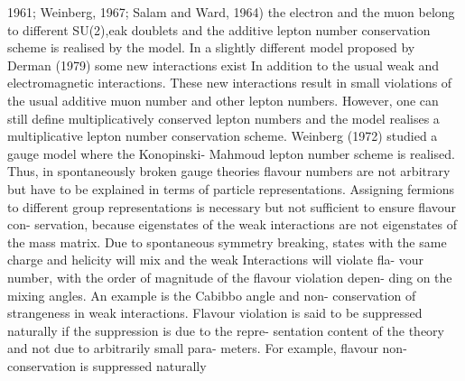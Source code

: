 \documentclass[twoside]{article}
\begin{document}
1961; Weinberg, 1967; Salam and Ward, 1964) the electron and the muon belong to
different SU(2),eak doublets and the additive lepton number conservation
scheme is realised by the model. In a slightly different model proposed
by Derman (1979) some new interactions exist In addition to the usual
weak and electromagnetic interactions. These new interactions result in
small violations of the usual additive muon number and other lepton
numbers. However, one can still define multiplicatively conserved lepton
numbers and the model realises a multiplicative lepton number conservation
scheme. Weinberg (1972) studied a gauge model where the Konopinski-
Mahmoud lepton number scheme is realised. Thus, in spontaneously broken
gauge theories flavour numbers are not arbitrary but have to be explained
in terms of particle representations. Assigning fermions to different
group representations is necessary but not sufficient to ensure flavour con-
servation, because eigenstates of the weak interactions are not eigenstates of
the mass matrix. Due to spontaneous symmetry breaking, states with the same
charge and helicity will mix and the weak Interactions will violate fla-
vour number, with the order of magnitude of the flavour violation depen-
ding on the mixing angles. An example is the Cabibbo angle and non-
conservation of strangeness in weak interactions. Flavour violation is
said to be suppressed naturally if the suppression is due to the repre-
sentation content of the theory and not due to arbitrarily small para-
meters. For example, flavour non-conservation is suppressed naturally
\end{document}
